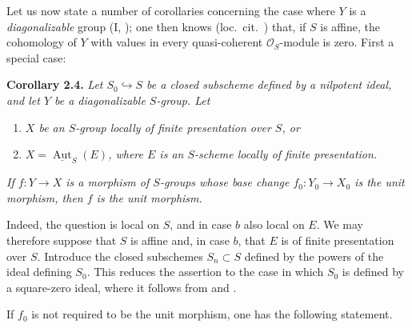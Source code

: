 Let us now state a number of corollaries concerning the case where \(Y\)
is a \emph{diagonalizable} group (I, ); one then knows (loc.\ cit.\
) that, if \(S\) is affine, the cohomology of \(Y\) with values in
every quasi-coherent \(\mathscr O_S\)-module is zero. First a special case:

\medskip
\noindent{}\textbf{Corollary 2.4.}
\textit{Let \(S_0\hookrightarrow S\) be a closed subscheme defined by
a nilpotent ideal, and let \(Y\) be a diagonalizable \(S\)-group. Let}
\begin{enumerate}
\item[\(a\)] \textit{\(X\) be an \(S\)-group locally of finite
  presentation over \(S\), or}
\item[\(b\)] \textit{\(X=\underline{\operatorname{Aut}}_S(E)\), where
  \(E\) is an \(S\)-scheme locally of finite presentation.}
\end{enumerate}
\textit{If \(f:Y\to X\) is a morphism of \(S\)-groups whose base
change \(f_0:Y_0\to X_0\) is the unit morphism, then \(f\) is the unit
morphism.}

Indeed, the question is local on \(S\), and in case \(b\) also local on
\(E\). We may therefore suppose that \(S\) is affine and, in case \(b\),
that \(E\) is of finite presentation over \(S\). Introduce the closed
subschemes \(S_n\subset S\) defined by the powers of the ideal defining
\(S_0\). This reduces the assertion to the case in which \(S_0\) is
defined by a square-zero ideal, where it follows from  and
\SGARefLink{sga3:iii:remark:2-2}{Remark 2.2}.

If \(f_0\) is not required to be the unit morphism, one has the
following statement.

